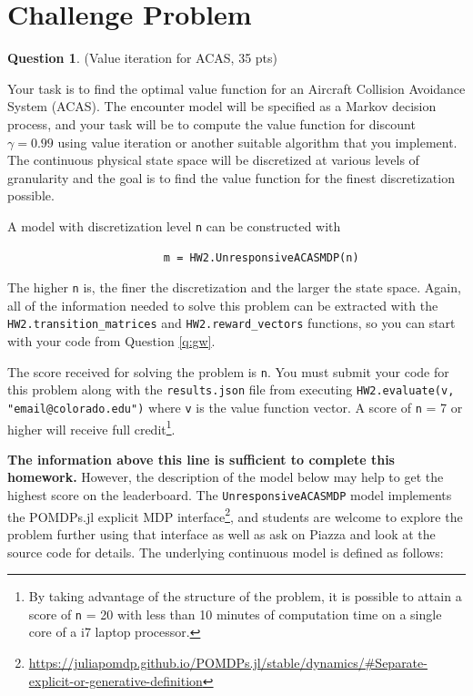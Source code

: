 \documentclass{article}
\theoremstyle{definition}
\newtheorem{question}[thm]{Question}
\begin{document}
\section{Challenge Problem}

\begin{question}
    (Value iteration for ACAS, 35 pts)

Your task is to find the optimal value function for an Aircraft Collision Avoidance System (ACAS). The encounter model will be specified as a Markov decision process, and your task will be to compute the value function for discount $\gamma=0.99$ using value iteration or another suitable algorithm that you implement. The continuous physical state space will be discretized at various levels of granularity and the goal is to find the value function for the finest discretization possible.

A model with discretization level \texttt{n} can be constructed with
\begin{verbatim}
                        m = HW2.UnresponsiveACASMDP(n)
\end{verbatim}
The higher \texttt{n} is, the finer the discretization and the larger the state space. Again, all of the information needed to solve this problem can be extracted with the \texttt{HW2.transition\_matrices} and \texttt{HW2.reward\_vectors} functions, so you can start with your code from Question \ref{q:gw}.

The score received for solving the problem is \texttt{n}. You must submit your code for this problem along with the \texttt{results.json} file from executing \texttt{HW2.evaluate(v, "email@colorado.edu")} where \texttt{v} is the value function vector. A score of \texttt{n} = 7 or higher will receive full credit\footnote{By taking advantage of the structure of the problem, it is possible to attain a score of \texttt{n} = 20 with less than 10 minutes of computation time on a single core of a i7 laptop processor.}.

\vspace{1em}
\noindent\makebox[\linewidth]{\rule{\textwidth}{0.4pt}}
\vspace{1em}

\textbf{The information above this line is sufficient to complete this homework.} However, the description of the model below may help to get the highest score on the leaderboard. The \texttt{UnresponsiveACASMDP} model implements the POMDPs.jl explicit MDP interface\footnote{\url{https://juliapomdp.github.io/POMDPs.jl/stable/dynamics/\#Separate-explicit-or-generative-definition}}, and students are welcome to explore the problem further using that interface as well as ask on Piazza and look at the source code for details. The underlying continuous model is defined as follows:


\end{question}
\end{document}
